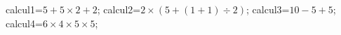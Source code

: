 \documentclass[exercice]{thedocument}%
\begin{document}
%
    \>calcul1=$5+5\times2+2$;%
    \>calcul2=$2\times(5+(1+1)\div2)$;%
    \>calcul3=$10-5+5$;%
    \>calcul4=$6\times4\times5\times5$;%
\end{document}
